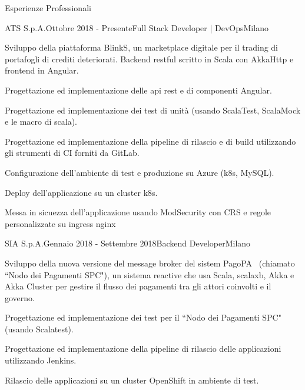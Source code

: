 \documentclass{resume} %
\begin{document}

\begin{rSection}{Esperienze Professionali}

\begin{rSubsection}{ATS S.p.A.}{Ottobre 2018 - Presente}{Full Stack Developer | DevOps}{Milano}
\item Sviluppo della piattaforma BlinkS, un marketplace digitale per il trading di portafogli di crediti deteriorati.
Backend restful scritto in Scala con AkkaHttp e frontend in Angular.
\item Progettazione ed implementazione delle api rest e di componenti Angular.
\item Progettazione ed implementazione dei test di unit\`a (usando ScalaTest, ScalaMock e le macro di scala).
\item Progettazione ed implementazione della pipeline di rilascio e di build utilizzando gli strumenti di CI forniti da GitLab.
\item Configurazione dell'ambiente di test e produzione su Azure (k8s, MySQL).
\item Deploy dell'applicazione su un cluster k8s.
\item Messa in sicuezza dell'applicazione usando ModSecurity con CRS e regole personalizzate su ingress nginx
\end{rSubsection}


\begin{rSubsection}{SIA S.p.A.}{Gennaio 2018 - Settembre 2018}{Backend Developer}{Milano}
\item Sviluppo della nuova versione del message broker del sistem PagoPA\textregistered~ (chiamato ``Nodo dei Pagamenti SPC"),
un sistema reactive che usa Scala, scalaxb, Akka e Akka Cluster per gestire il flusso dei pagamenti tra gli attori coinvolti e il governo.
\item Progettazione ed implementazione dei test per il ``Nodo dei Pagamenti SPC" (usando Scalatest).
\item Progettazione ed implementazione della pipeline di rilascio delle applicazioni utilizzando Jenkins.
\item Rilascio delle applicazioni su un cluster OpenShift in ambiente di test.
\end{rSubsection}


\end{rSection}
\end{document}
